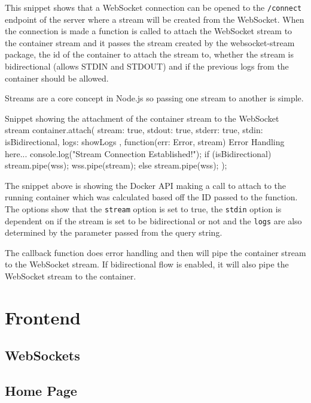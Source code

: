 This snippet shows that a WebSocket connection can be opened to the \texttt{/connect} endpoint of the server where a stream will be created from the WebSocket. When the connection is made a function is called to attach the WebSocket stream to the container stream and it passes the stream created by the websocket-stream package, the id of the container to attach the stream to, whether the stream is bidirectional (allows STDIN and STDOUT) and if the previous logs from the container should be allowed.

Streams are a core concept in Node.js so passing one stream to another is simple.

\begin{sexylisting}{Snippet showing the attachment of the container stream to the WebSocket stream}
container.attach(
    {
        stream: true,
        stdout: true,
        stderr: true,
        stdin: isBidirectional,
        logs: showLogs
    },
    function(err: Error, stream) {
        {Error Handling here...}
        console.log("Stream Connection Established!");
        if (isBidirectional) {
            stream.pipe(wss);
            wss.pipe(stream);
        } else {
            stream.pipe(wss);
        }
    }
);
\end{sexylisting}

The snippet above is showing the Docker API making a call to attach to the running container which was calculated based off the ID passed to the function. The options show that the \texttt{stream} option is set to true, the \texttt{stdin} option is dependent on if the stream is set to be bidirectional or not and the \texttt{logs} are also determined by the parameter passed from the query string.

The callback function does error handling and then will pipe the container stream to the WebSocket stream. If bidirectional flow is enabled, it will also pipe the WebSocket stream to the container. 


\section{Frontend}

\subsection{WebSockets}

\subsection{Home Page}

